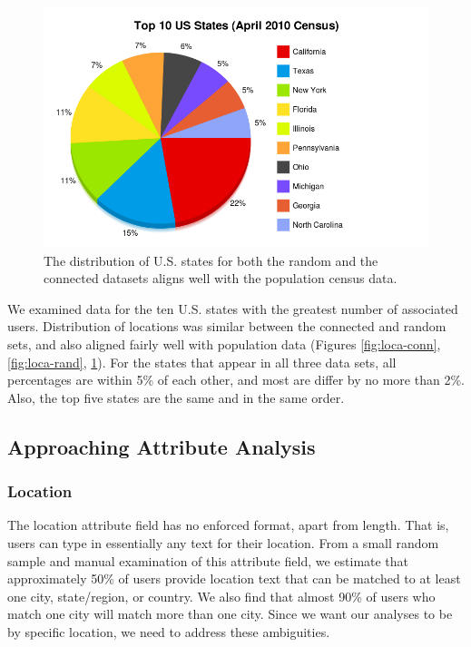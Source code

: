 \begin{figure}[t]
 \includegraphics[bb=0 0 800 500,scale=.2]{./images/loca-actu.png}
\caption{The distribution of U.S. states for both the random and the connected datasets aligns well with the population census data.}
\label{fig:loca-actu}
\end{figure}

We examined data for the ten U.S. states with the greatest number of associated users.  Distribution of locations was similar between the connected and random sets, and also aligned fairly well with population data (Figures \ref{fig:loca-conn}, \ref{fig:loca-rand}, \ref{fig:loca-actu}).  For the states that appear in all three data sets, all percentages are within 5\% of each other, and most are differ by no more than 2\%.  Also, the top five states are the same and in the same order.

\subsection{Approaching Attribute Analysis}

\subsubsection{Location}

The location attribute field has no enforced format, apart from length.  That is, users can type in essentially any text for their location.  From a small random sample and manual examination of this attribute field, we estimate that approximately 50\% of users provide location text that can be matched to at least one city, state/region, or country.  We also find that almost 90\% of users who match one city will match more than one city.  Since we want our analyses to be by specific location, we need to address these ambiguities.

